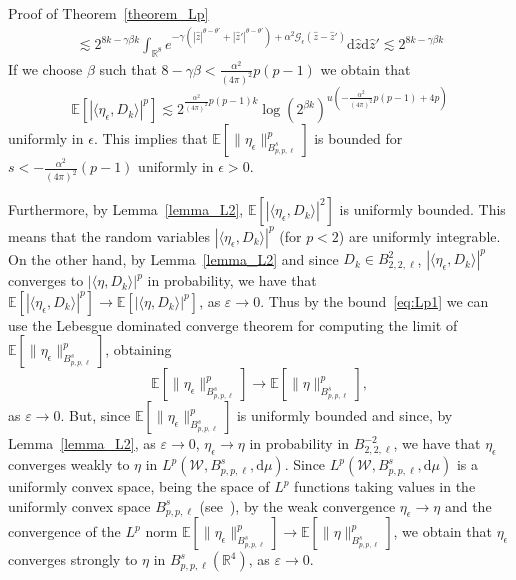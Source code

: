 \documentclass[a4paper,10pt]{article}
\newcommand{\mathd}{\mathrm{d}}
\newenvironment{proof*}[1]{\noindent\textbf{#1\ }}{\hspace*{\fill}$\Box$\medskip}
\begin{document}
\begin{proof*}{Proof of Theorem~\ref{theorem_Lp}}
\[\begin{array}{c}
       \lesssim 2^{8 k - \gamma \beta k} \int_{\mathbb{R}^8} e^{- \gamma (|
       \hat{z} |^{\theta - \theta'} + | \hat{z}' |^{\theta - \theta'}) +
       \alpha^2 \mathcal{G}_{\epsilon} (\hat{z} - \hat{z}')} \mathd \hat{z}
       \mathd \hat{z}' \lesssim 2^{8 k - \gamma \beta k}
     \end{array} \]
  If we choose $\beta$ such that $8 - \gamma \beta < \frac{\alpha^2}{(4
  \pi)^2} p (p - 1)$ we obtain that
  \begin{equation}
    \mathbb{E} [| \langle \eta_{\epsilon}, D_k \rangle |^p] \lesssim
    2^{\frac{\alpha^2}{(4 \pi)^2} p (p - 1) k} \log (2^{\beta k})^{u \left( -
    \frac{\alpha^2}{(4 \pi)^2} p (p - 1) + 4 p \right)} \label{eq:Lp1}
  \end{equation}
  uniformly in $\epsilon$. This implies that $\mathbb{E} [\| \eta_{\epsilon}
  \|_{B^s_{p, p, \ell}}^p]$ is bounded for $s < - \frac{\alpha^2}{(4 \pi)^2}
  (p - 1)$ uniformly in $\epsilon > 0$.
  
  Furthermore, by Lemma~\ref{lemma_L2}, $\mathbb{E} [| \langle
  \eta_{\epsilon}, D_k \rangle |^2]$ is uniformly bounded. This means that the
  random variables $| \langle \eta_{\epsilon}, D_k \rangle |^p$ (for $p < 2$)
  are uniformly integrable. On the other hand, by Lemma~\ref{lemma_L2} and
  since $D_k \in B^2_{2, 2, \ell}$, $| \langle \eta_{\epsilon}, D_k \rangle
  |^p$ converges to $| \langle \eta, D_k \rangle |^p$ in probability, we have
  that $\mathbb{E} [| \langle \eta_{\epsilon}, D_k \rangle |^p] \rightarrow
  \mathbb{E} [| \langle \eta, D_k \rangle |^p]$, as $\varepsilon \rightarrow
  0$. Thus by the bound~{\eqref{eq:Lp1}} we can use the Lebesgue dominated
  converge theorem for computing the limit of $\mathbb{E} [\| \eta_{\epsilon}
  \|_{B^s_{p, p, \ell}}^p]$, obtaining
  \[ \mathbb{E} [\| \eta_{\epsilon} \|_{B^s_{p, p, \ell}}^p] \rightarrow
     \mathbb{E} [\| \eta \|_{B^s_{p, p, \ell}}^p], \]
  as $\varepsilon \rightarrow 0$. But, since $\mathbb{E} [\| \eta_{\epsilon}
  \|_{B^s_{p, p, \ell}}^p]$ is uniformly bounded and since, by
  Lemma~\ref{lemma_L2}, as $\varepsilon \rightarrow 0$, $\eta_{\epsilon}
  \rightarrow \eta$ in probability in $B^{- 2}_{2, 2, \ell}$, we have that
  $\eta_{\epsilon}$ converges weakly to $\eta$ in $L^p (\mathcal{W}, B^s_{p,
  p, \ell}, \mathd \mu)$. Since $L^p (\mathcal{W}, B^s_{p, p, \ell}, \mathd
  \mu)$ is a uniformly convex space, being the space of $L^p$ functions taking
  values in the uniformly convex space $B^s_{p, p, \ell}$
  (see~{\cite{Boyko2009}}), by the weak convergence $\eta_{\epsilon}
  \rightarrow \eta$ and the convergence of the $L^p$ norm $\mathbb{E} [\|
  \eta_{\epsilon} \|_{B^s_{p, p, \ell}}^p] \rightarrow \mathbb{E} [\| \eta
  \|_{B^s_{p, p, \ell}}^p]$, we obtain that $\eta_{\epsilon}$ converges
  strongly to $\eta$ in $B^s_{p, p, \ell} (\mathbb{R}^4)$, as $\varepsilon
  \rightarrow 0$. 
\end{proof*}
\end{document}
